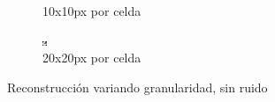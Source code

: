 \documentclass[11pt]{beamer}
\begin{document}
\begin{frame}
\begin{figure}[H]
\begin{subfigure}[h]{0.30\textwidth}
            \caption{10x10px por celda}
            \label{fig:reconstruccion 10 px}
        \end{subfigure}%
    \hfill
        \begin{subfigure}[h]{0.30\textwidth} 
            \includegraphics[width=\textwidth]{img/tomo_granu_20.png}
            \caption{20x20px por celda}
            \label{fig:reconstruccion 20 px}
        \end{subfigure}
        
        \caption{Reconstrucción variando granularidad, sin ruido}
    \end{figure}
\end{frame}
    
\end{document}
